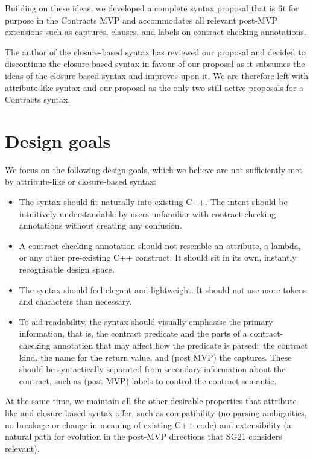 Building on these ideas, we developed a complete syntax proposal that is fit for purpose in the Contracts MVP and accommodates all relevant post-MVP extensions such as captures,  clauses, and labels on contract-checking annotations.

The author of the closure-based syntax has reviewed our proposal and decided to discontinue the closure-based syntax in favour of our proposal as it subsumes the ideas of the closure-based syntax and improves upon it. We are therefore left with attribute-like syntax and our proposal as the only two still active proposals for a Contracts syntax.



\section{Design goals}
\label{sec:design}

We focus on the following design goals, which we believe are not sufficiently met by attribute-like or closure-based syntax:

\begin{itemize}
\item The syntax should fit naturally into existing C++. The intent should be intuitively understandable by users unfamiliar with contract-checking annotations without creating any confusion.
\item A contract-checking annotation should not resemble an attribute, a lambda, or any other pre-existing C++ construct. It should sit in its own, instantly recognisable design space.
\item The syntax should feel elegant and lightweight. It should not use more tokens and characters than necessary.
\item To aid readability, the syntax should visually emphasise the primary information, that is, the contract predicate and the parts of a contract-checking annotation that may affect how the predicate is parsed: the contract kind, the name for the return value, and (post MVP) the captures. These should be syntactically separated from secondary information about the contract, such as (post MVP) labels to control the contract semantic.
\end{itemize}

 At the same time, we maintain all the other desirable properties that attribute-like and closure-based syntax offer, such as compatibility (no parsing ambiguities, no breakage or change in meaning of existing C++ code) and extensibility (a natural path for evolution in the post-MVP directions that SG21 considers relevant).
 
